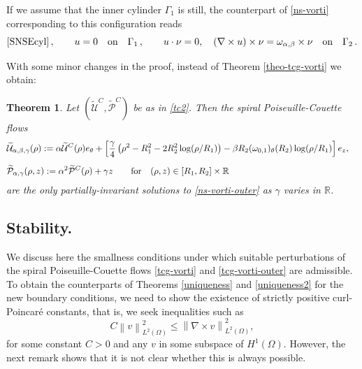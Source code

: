 \documentclass[a4paper,11pt]{amsart}
\newtheorem{theorem}{Theorem}[section]
\numberwithin{equation}{section}
\numberwithin{figure}{section}
\def\U{{\mathcal U}}
\def\P{{\mathcal P}}
\newcommand{\norm}[1]{\left \lVert #1 \right \rVert}
\begin{document}
If we assume that the inner cylinder $\Gamma_1$ is still, the counterpart of \eqref{ns-vorti} corresponding to this configuration reads
\begin{equation}\label{ns-vorti-outer}
	\mbox{\eqref{SNSEcyl}}\, ,\qquad u =0 \quad \text{on}\quad \Gamma_1\,, \qquad u\cdot \nu =0, \quad (\nabla \times u)\times \nu = \omega_{\alpha,\beta}\times \nu \quad \text{on}\quad \Gamma_2\, .
\end{equation}


With some minor changes in the proof, instead of Theorem \ref{theo-tcg-vorti} we obtain:


\begin{theorem}\label{theo-tcg-vorti-outer}
	Let $({ \widetilde\U^C},{\widetilde\P^C})$ be as in \eqref{tc2}. Then the spiral Poiseuille-Couette flows
	\begin{eqnarray}
			& \widetilde\U_{\alpha,\beta,\gamma}(\rho) := \alpha\widetilde\U^C(\rho)e_\theta+  \left[ \frac{\gamma}{4}\left(\rho^2 - R_1^2 -2R_2^2 \log (\rho/R_1)\right)  -\beta R_2(\omega_{0,1})_\theta(R_2)\log (\rho/R_1)\right] e_z,  &  \notag \\[5pt]
			 &\widetilde\P_{\alpha,\gamma}(\rho, z) := \alpha^2\widetilde\P^C(\rho)+ \gamma z \qquad \text{for} \quad  (\rho, z)\in [R_1,R_2]\times \mathbb{R}\, & 
            \label{tcg-vorti-outer} 
	\end{eqnarray}
	are the only partially-invariant solutions  to \eqref{ns-vorti-outer} as $\gamma$ varies in $\mathbb{R}$.
\end{theorem}



\subsection{Stability.}\label{unrestrictvorticity}
 
We discuss here the smallness conditions under which suitable perturbations of the spiral Poiseuille-Couette flows \eqref{tcg-vorti} and \eqref{tcg-vorti-outer} are admissible.
To obtain the counterparts of Theorems \ref{uniqueness} and \ref{uniqueness2} for the new boundary conditions, we need to show the existence of strictly positive curl-Poincaré constants, that is, we seek inequalities such as 
\begin{equation}\label{eq:genericPoincarecurl}
C \norm{v}^2_{L^2(\Omega)}\leq \norm{\nabla\times v}_{L^2(\Omega)}^2,    
\end{equation}
for some constant $C>0$ and any $v$ in some subspace of $H^1(\Omega)$. However, the next remark shows that it is not clear whether this is always possible.
\end{document}
